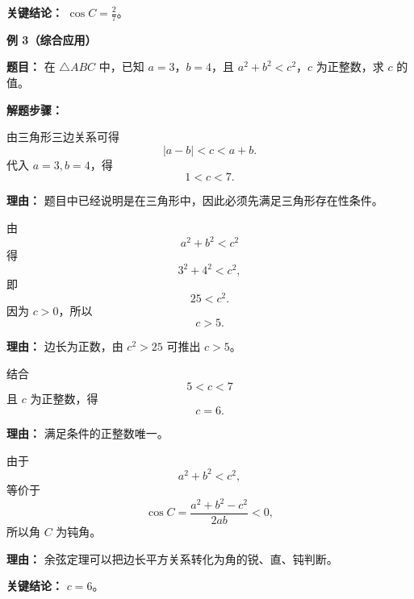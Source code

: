 \begin{examplebox}
	\textbf{\textcolor{CExample}{关键结论：}} \textbf{$\cos C = \frac{2}{7}$}。

	\medskip
	\textbf{\textcolor{CExample}{例 3（综合应用）}}

	\textbf{\textcolor{CExample}{题目：}} 在 $\triangle ABC$ 中，已知 $a=3$，$b=4$，且 $a^2 + b^2 < c^2$，$c$ 为正整数，求 $c$ 的值。

	\textbf{\textcolor{CExample}{解题步骤：}}
	\begin{description}[style=nextline, leftmargin=2.8em, labelsep=0.5em, itemsep=0.45em]
		\item[\textbf{第一步（三边条件）：}] 由三角形三边关系可得
		      \[
			      |a-b|<c<a+b.
		      \]
		      代入 $a=3,b=4$，得
		      \[
			      1<c<7.
		      \]
		      \par\textbf{理由：} 题目中已经说明是在三角形中，因此必须先满足三角形存在性条件。

		\item[\textbf{第二步（钝角条件）：}] 由
		      \[
			      a^2+b^2<c^2
		      \]
		      得
		      \[
			      3^2+4^2<c^2,
		      \]
		      即
		      \[
			      25<c^2.
		      \]
		      因为 $c>0$，所以
		      \[
			      c>5.
		      \]
		      \par\textbf{理由：} 边长为正数，由 $c^2>25$ 可推出 $c>5$。

		\item[\textbf{第三步（综合求整数）：}] 结合
		      \[
			      5<c<7
		      \]
		      且 $c$ 为正整数，得
		      \[
			      c=6.
		      \]
		      \par\textbf{理由：} 满足条件的正整数唯一。

		\item[\textbf{第四步（角度含义）：}] 由于
		      \[
			      a^2+b^2<c^2,
		      \]
		      等价于
		      \[
			      \cos C=\frac{a^2+b^2-c^2}{2ab}<0,
		      \]
		      所以角 $C$ 为钝角。
		      \par\textbf{理由：} 余弦定理可以把边长平方关系转化为角的锐、直、钝判断。
	\end{description}

	\textbf{\textcolor{CExample}{关键结论：}} \textbf{$c=6$}。
\end{examplebox}